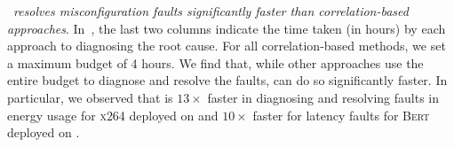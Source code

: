 \ourapproach~{\em resolves misconfiguration faults significantly faster than correlation-based approaches}. In~, the last two columns indicate the time taken (in hours) by each approach to diagnosing the root cause. For all correlation-based methods, we set a maximum budget of 4 hours. We find that, while other approaches use the entire budget to diagnose and resolve the faults, \ourapproach can do so significantly faster. In particular, we observed that \ourapproach is $13\times$ faster in diagnosing and resolving faults in energy usage for \textsc{x264} deployed on \xavier and $10\times$ faster for latency faults for \textsc{Bert} deployed on \txtwo. 






